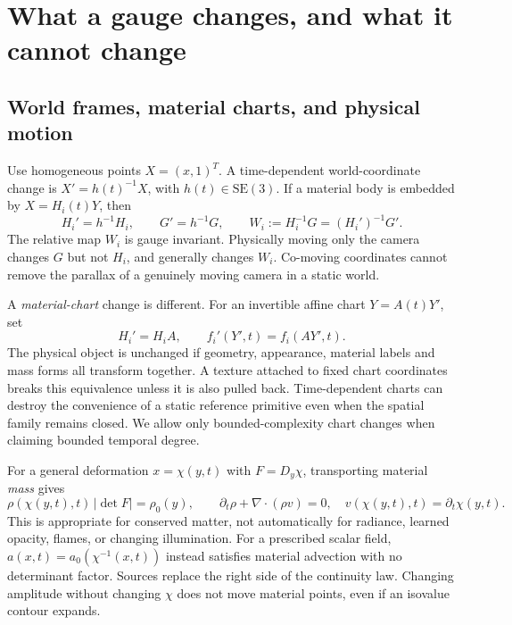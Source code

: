 \documentclass[10pt,letterpaper]{article}
\theoremstyle{remark}\newtheorem{counterexample}[proposition]{Counterexample}
\newcommand{\SE}{\mathrm{SE}}
\begin{document}
\section{What a gauge changes, and what it cannot change}

\subsection{World frames, material charts, and physical motion}
Use homogeneous points $X=(x,1)^T$. A time-dependent world-coordinate change is $X'=h(t)^{-1}X$, with $h(t)\in\SE(3)$. If a material body is embedded by $X=H_i(t)Y$, then
\begin{equation}
 H_i'=h^{-1}H_i,\qquad G'=h^{-1}G,\qquad
 W_i:=H_i^{-1}G=(H_i')^{-1}G'. \label{eq:relative}
\end{equation}
The relative map $W_i$ is gauge invariant. Physically moving only the camera changes $G$ but not $H_i$, and generally changes $W_i$. Co-moving coordinates cannot remove the parallax of a genuinely moving camera in a static world.

A \emph{material-chart} change is different. For an invertible affine chart $Y=A(t)Y'$, set
\begin{equation}
 H_i'=H_iA,\qquad f_i'(Y',t)=f_i(AY',t).
\end{equation}
The physical object is unchanged if geometry, appearance, material labels and mass forms all transform together. A texture attached to fixed chart coordinates breaks this equivalence unless it is also pulled back. Time-dependent charts can destroy the convenience of a static reference primitive even when the spatial family remains closed. We allow only bounded-complexity chart changes when claiming bounded temporal degree.

For a general deformation $x=\chi(y,t)$ with $F=D_y\chi$, transporting material \emph{mass} gives
\begin{equation}
 \rho(\chi(y,t),t)\,|\det F|=\rho_0(y),\qquad
 \partial_t\rho+\nabla\cdot(\rho v)=0,
 \quad v(\chi(y,t),t)=\partial_t\chi(y,t). \label{eq:mass}
\end{equation}
This is appropriate for conserved matter, not automatically for radiance, learned opacity, flames, or changing illumination. For a prescribed scalar field, $a(x,t)=a_0(\chi^{-1}(x,t))$ instead satisfies material advection with no determinant factor. Sources replace the right side of the continuity law. Changing amplitude without changing $\chi$ does not move material points, even if an isovalue contour expands.
\end{document}
